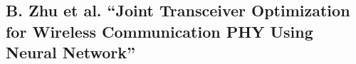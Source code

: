 \subsection{B. Zhu et al. “Joint Transceiver Optimization for Wireless Communication PHY Using Neural Network” \autocite{8664650}}





